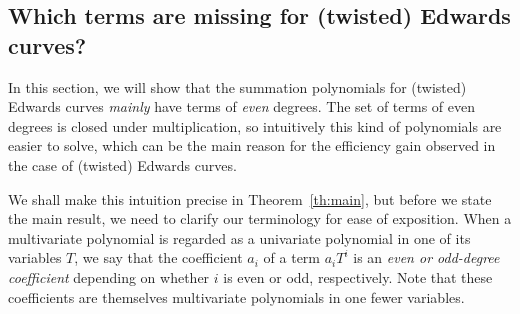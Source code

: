 %
%

\subsection{Which terms are missing for (twisted) Edwards curves?}
\label{sec:twisted-edwards-summation-polynomial}

%
%



In this section, we will show that the summation polynomials for
(twisted) Edwards curves \emph{mainly} have terms of \emph{even}
degrees.
%
The set of terms of even degrees is closed under multiplication, so
intuitively this kind of polynomials are easier to solve, which can be
the main reason for the efficiency gain observed in the case of
(twisted) Edwards curves.

We shall make this intuition precise in Theorem~\ref{th:main}, but
before we state the main result, we need to clarify our terminology
for ease of exposition.
%
When a multivariate polynomial is regarded as a univariate polynomial
in one of its variables $T$, we say that the coefficient $a_i$ of a
term $a_iT^i$ is an \emph{even or odd-degree coefficient} depending on
whether $i$ is even or odd, respectively.
%
Note that these coefficients are themselves multivariate polynomials
in one fewer variables.

